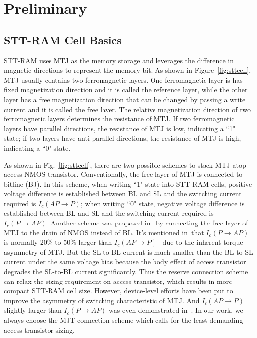 \section{Preliminary} \label{sec:prelim}

\subsection{STT-RAM Cell Basics} \label{subsec:cell}
STT-RAM uses MTJ as the memory storage and leverages the difference in magnetic directions to represent the memory bit.  As shown in Figure~\ref{fig:sttcell}, MTJ usually contains two ferromagnetic layers.  One ferromagnetic layer is has fixed magnetization direction and it is called the reference layer, while the other layer has a free magnetization direction that can be changed by passing a write current and it is called the free layer. The relative magnetization direction of two ferromagnetic layers determines the resistance of MTJ.  If two ferromagnetic layers have parallel directions, the resistance of MTJ is low, indicating a ``1" state; if two layers have anti-parallel directions, the resistance of MTJ is high, indicating a ``0" state.

As shown in Fig.~\ref{fig:sttcell}, there are two possible schemes to stack MTJ atop access NMOS transistor. Conventionally, the free layer of MTJ is connected to bitline (BJ). In this scheme, when writing ``1" state into STT-RAM cells, positive voltage difference is established between BL and SL and the switching current required is $I_{c}(AP\rightarrow P)$; when writing ``0" state, negative voltage difference is established between BL and SL and the switching current required is $I_{c}(P\rightarrow AP)$. Another scheme was proposed in~\cite{STTRAM:Qualcomm09} by connecting the free layer of MTJ to the drain of NMOS instead of BL. It's mentioned in~\cite{STTRAM:Qualcomm09}that $I_{c}(P\rightarrow AP)$ is normally 20\% to 50\% larger than $I_{c}(AP\rightarrow P)$~\cite{STTRAM:APL05,STTRAM:PRB05} due to the inherent torque asymmetry of MTJ. But the SL-to-BL current is much smaller than the BL-to-SL current under the same voltage bias because the body effect of access transistor degrades the SL-to-BL current significantly. Thus the reserve connection scheme can relax the sizing requirement on access transistor, which results in more compact STT-RAM cell size. However, device-level efforts have been put to improve the asymmetry of switching characteristic of MTJ. And $I_{c}(AP\rightarrow P)$ slightly larger than $I_{c}(P\rightarrow AP)$ was even demonstrated in~\cite{STTRAM:Grandis07}. In our work, we always choose the MJT connection scheme which calls for the least demanding access transistor sizing.

